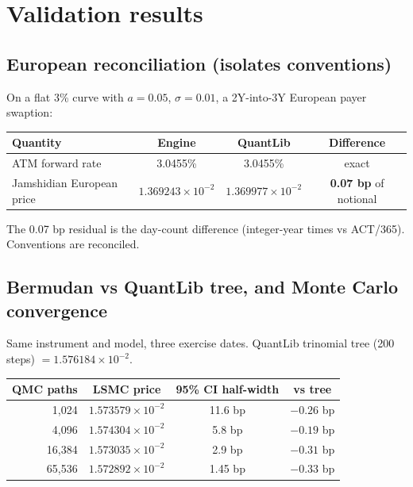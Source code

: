 \documentclass[11pt]{article}
\begin{document}
\section{Validation results}

\subsection{European reconciliation (isolates conventions)}

On a flat 3\% curve with $a = 0.05$, $\sigma = 0.01$, a 2Y-into-3Y European payer swaption:

\begin{center}
\begin{tabular}{lccc}
\toprule
Quantity & Engine & QuantLib & Difference \\
\midrule
ATM forward rate & 3.0455\% & 3.0455\% & exact \\
Jamshidian European price & $1.369243\times10^{-2}$ & $1.369977\times10^{-2}$ & \textbf{0.07 bp} of notional \\
\bottomrule
\end{tabular}
\end{center}

\noindent The 0.07 bp residual is the day-count difference (integer-year times vs
ACT/365). Conventions are reconciled.

\subsection{Bermudan vs QuantLib tree, and Monte Carlo convergence}

Same instrument and model, three exercise dates. QuantLib trinomial tree (200 steps)
$= 1.576184\times10^{-2}$.

\begin{center}
\begin{tabular}{rccc}
\toprule
QMC paths & LSMC price & 95\% CI half-width & vs tree \\
\midrule
1{,}024  & $1.573579\times10^{-2}$ & 11.6 bp & $-0.26$ bp \\
4{,}096  & $1.574304\times10^{-2}$ & 5.8 bp  & $-0.19$ bp \\
16{,}384 & $1.573035\times10^{-2}$ & 2.9 bp  & $-0.31$ bp \\
65{,}536 & $1.572892\times10^{-2}$ & 1.45 bp & $-0.33$ bp \\
\bottomrule
\end{tabular}
\end{center}
\end{document}
